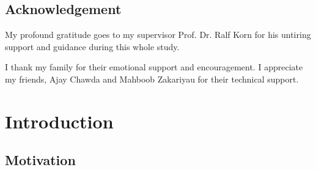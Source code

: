 \documentclass[a4paper,11pt,oneside]{book}
\begin{document}
	
	
	
	\frontmatter
	\tableofcontents
	\begin{titlepage}
	\section*{Acknowledgement}
	My profound gratitude goes to my supervisor Prof. Dr. Ralf Korn for his untiring support and guidance during this whole study.\newline
	
	I thank my family for their emotional support and encouragement. I appreciate my friends, Ajay Chawda and Mahboob Zakariyau for their technical support.
	\end{titlepage}

\thispagestyle{empty}

\newpage\null\thispagestyle{empty}\newpage


\mainmatter
\chapter{Introduction}




\section{Motivation}
\end{document}
